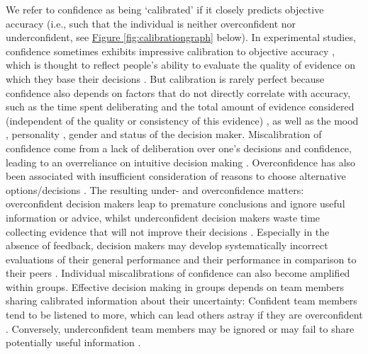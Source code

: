 \documentclass[a4paper, nobind]{templates/ociamthesis}
\begin{document}
\hfill\break
We refer to confidence as being `calibrated' if it closely predicts objective accuracy (i.e., such that the individual is neither overconfident nor underconfident, see \hyperref[fig:calibrationgraph]{Figure \ref{fig:calibrationgraph}} below). In experimental studies, confidence sometimes exhibits impressive calibration to objective accuracy \autocite{boldt_shared_2015}, which is thought to reflect people's ability to evaluate the quality of evidence on which they base their decisions \autocite{xue_challenging_2023}. But calibration is rarely perfect because confidence also depends on factors that do not directly correlate with accuracy, such as the time spent deliberating and the total amount of evidence considered (independent of the quality or consistency of this evidence) \autocite{kiani_choice_2014}, as well as the mood \autocite{rouault_psychiatric_2018}, personality \autocite{schaefer_overconfidence_2004}, gender \autocite{syzmanowicz_gender_2011} and status \autocite{see_detrimental_2011} of the decision maker. Miscalibration of confidence come from a lack of deliberation over one's decisions and confidence, leading to an overreliance on intuitive decision making \autocite{mata_metacognitive_2013}. Overconfidence has also been associated with insufficient consideration of reasons to choose alternative options/decisions \autocite{koriat_reasons_1980,scherer_trust_2015}. The resulting under- and overconfidence matters: overconfident decision makers leap to premature conclusions and ignore useful information or advice, whilst underconfident decision makers waste time collecting evidence that will not improve their decisions \autocite{desender_subjective_2018}. Especially in the absence of feedback, decision makers may develop systematically incorrect evaluations of their general performance \autocite{rouault_forming_2019} and their performance in comparison to their peers \autocite{kruger_unskilled_1999}. Individual miscalibrations of confidence can also become amplified within groups. Effective decision making in groups depends on team members sharing calibrated information about their uncertainty: Confident team members tend to be listened to more, which can lead others astray if they are overconfident \autocite{zarnoth_social_1997}. Conversely, underconfident team members may be ignored or may fail to share potentially useful information \autocite{silver_wise_2021}.

\newpage
\end{document}
